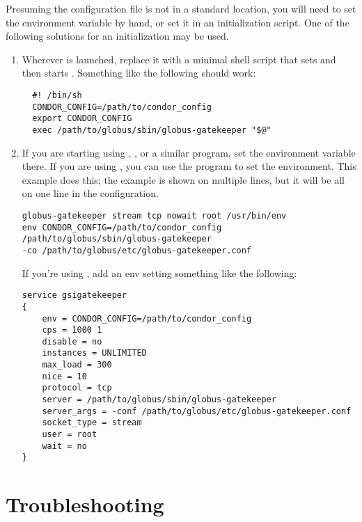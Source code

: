 Presuming the configuration file is not in a standard location,
you will need to set the  environment variable
by hand, or set it in an initialization script.
One of the following solutions for an initialization may be used.
\begin{enumerate}
\item 
Wherever  is launched,
replace it with a minimal shell script that sets
 and then starts .
Something like the following should work:

\footnotesize
\begin{verbatim}
  #! /bin/sh
  CONDOR_CONFIG=/path/to/condor_config
  export CONDOR_CONFIG
  exec /path/to/globus/sbin/globus-gatekeeper "$@"
\end{verbatim}
\normalsize
\item 
If you are starting  using ,
, or a similar program,
set the environment variable there.
If you are using , you can use the  program
to set the environment.
This example does this;
the example is shown on multiple lines,
but it will be all on one line in the  configuration. 
\footnotesize
\begin{verbatim}
globus-gatekeeper stream tcp nowait root /usr/bin/env
env CONDOR_CONFIG=/path/to/condor_config
/path/to/globus/sbin/globus-gatekeeper
-co /path/to/globus/etc/globus-gatekeeper.conf
\end{verbatim}
\normalsize
If you're using , add an env setting
something like the following:
\footnotesize
\begin{verbatim}
service gsigatekeeper
{
    env = CONDOR_CONFIG=/path/to/condor_config
    cps = 1000 1
    disable = no
    instances = UNLIMITED
    max_load = 300
    nice = 10
    protocol = tcp
    server = /path/to/globus/sbin/globus-gatekeeper
    server_args = -conf /path/to/globus/etc/globus-gatekeeper.conf
    socket_type = stream
    user = root
    wait = no
}
\end{verbatim}
\normalsize

\end{enumerate}

\section{Troubleshooting}


